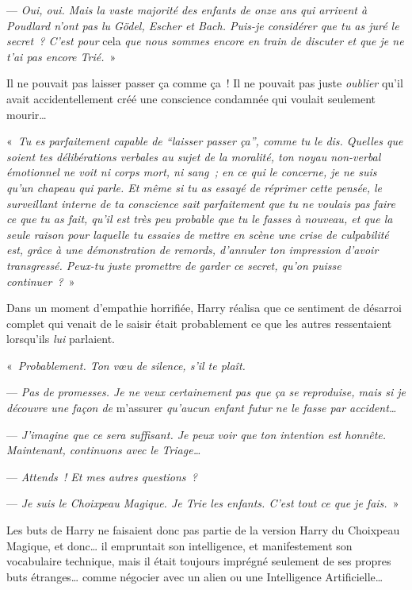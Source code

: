 --- \emph{Oui, oui. Mais la vaste majorité des enfants de onze ans qui arrivent à Poudlard n'ont pas lu Gödel, Escher et Bach. Puis-je considérer que tu as juré le secret~? C'est pour} cela \emph{que nous sommes encore en train de discuter et que je ne t'ai pas encore Trié.}~»

Il ne pouvait pas laisser passer ça comme ça~! Il ne pouvait pas juste \emph{oublier} qu'il avait accidentellement créé une conscience condamnée qui voulait seulement mourir…

«~\emph{Tu es parfaitement capable de “laisser passer ça”, comme tu le dis. Quelles que soient tes délibérations verbales au sujet de la moralité, ton noyau non-verbal émotionnel ne voit ni corps mort, ni sang~; en ce qui le concerne, je ne suis qu'un chapeau qui parle. Et même si tu as essayé de réprimer cette pensée, le surveillant interne de ta conscience sait parfaitement que tu ne voulais pas faire ce que tu as fait, qu'il est très peu probable que tu le fasses à nouveau, et que la seule raison pour laquelle tu essaies de mettre en scène une crise de culpabilité est, grâce à une démonstration de remords, d'annuler ton impression d'avoir transgressé. Peux-tu juste promettre de garder ce secret, qu'on puisse continuer~?}~»

Dans un moment d'empathie horrifiée, Harry réalisa que ce sentiment de désarroi complet qui venait de le saisir était probablement ce que les autres ressentaient lorsqu'ils \emph{lui} parlaient.

«~\emph{Probablement. Ton vœu de silence, s'il te plaît.}

--- \emph{Pas de promesses. Je ne veux certainement pas que ça se reproduise, mais si je découvre une façon de} m'assurer \emph{qu'aucun enfant futur ne le fasse par accident…}

--- \emph{J'imagine que ce sera suffisant. Je peux voir que ton intention est honnête. Maintenant, continuons avec le Triage…}

--- \emph{Attends~! Et mes autres questions~?}

--- \emph{Je suis le Choixpeau Magique. Je Trie les enfants. C'est tout ce que je fais.}~»

Les buts de Harry ne faisaient donc pas partie de la version Harry du Choixpeau Magique, et donc… il empruntait son intelligence, et manifestement son vocabulaire technique, mais il était toujours imprégné seulement de ses propres buts étranges… comme négocier avec un alien ou une Intelligence Artificielle…

